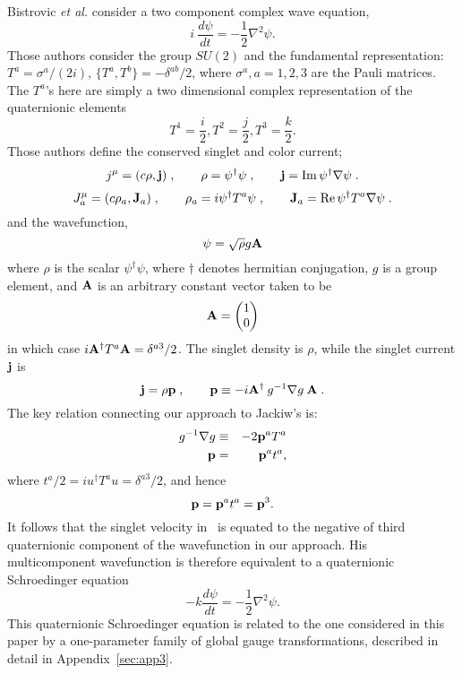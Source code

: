 \documentclass[a4paper,aps,prd,preprint,groupedaddress]{revtex4}
\begin{document}
Bistrovic {\it et al.} consider a two component complex wave equation,
\begin{equation}\label{jackse}
i\: \frac{d\psi}{dt} = -\frac{1}{2} \nabla^2 \psi.
\end{equation}
Those authors consider the group $SU(2)$ and the fundamental representation: $T^a={\sigma^a}/{(2i)}$, $\{T^a,T^b\}=-\delta^{ab}/2$, where $\sigma^a, a=1,2,3$ are the Pauli matrices. The $T^a$'s here are simply a two dimensional complex representation of the quaternionic elements
\begin{equation}
\mbox{$T^1 = \frac{i}{2}$}, \mbox{$T^2 = \frac{j}{2}$}, \mbox{$T^3 = \frac{k}{2}$}.
\end{equation}
Those authors define the conserved singlet and color current;
\begin{equation}
j^\mu=(c \rho, {\bf j})\;,\qquad \rho
	= \psi^\dagger \psi\;, \qquad
{\bf j} = \mathrm{Im}\, 
	\psi^\dagger \nabla \psi\;.
\end{equation}
\begin{equation}
J^\mu_a=(c \rho_a, {\bf J}_a)\;,\qquad \rho_a
	= i \psi^\dagger T^a \psi\;, \qquad
{\bf J}_a = \mathrm{Re}\,\psi^\dagger T^a 
	\nabla \psi\;.
\end{equation}
and the wavefunction,
\begin{equation}
\psi=\sqrt{\rho} g {\bf A}
\end{equation}
where $\rho$ is the scalar $\psi^\dagger\psi$, where $\dagger$ denotes hermitian conjugation, $g$ is a
group element, and ${\bf A}$ is an arbitrary constant vector taken to be
\begin{equation}
{\bf A}=
\begin{pmatrix}
1\\0\\
\end{pmatrix}
\end{equation} 
in which case $i{\bf A}^\dagger T^a {\bf A}= \delta^{a3}/2$.  The singlet density is $\rho$,
while the singlet current ${\bf j}$ is
\begin{equation}
{\bf j}=\rho{\bf p}\;, \qquad {\bf p}\equiv 
	-i {\bf A}^\dagger  \:g^{-1}\nabla g\:{\bf A}
\;.
\end{equation}
The key relation connecting our approach to Jackiw's is:
\begin{eqnarray}
g^{-1}\nabla g &\equiv& -2{\bf p}^a T^a\\
{\bf p}&=&{\bf p}^a t^a,
\end{eqnarray} 
where $t^a/2=iu^\dagger T^a u= \delta^{a3}/2$, and hence
\begin{equation}
{\bf p}={\bf p}^a t^a= {\bf p}^3.
\end{equation} 
It follows that the singlet velocity in~\cite{bib:jackiw2} is equated to the negative of third quaternionic component of the wavefunction in our approach. His multicomponent wavefunction is therefore equivalent to a quaternionic Schroedinger equation
\begin{equation}
-k\frac{d\psi}{dt} = -\frac{1}{2} \nabla^2 \psi.
\end{equation}
This quaternionic Schroedinger equation is related to the one considered in this paper by a one-parameter family of global gauge transformations, described in detail in Appendix~\ref{sec:app3}.
\end{document}
